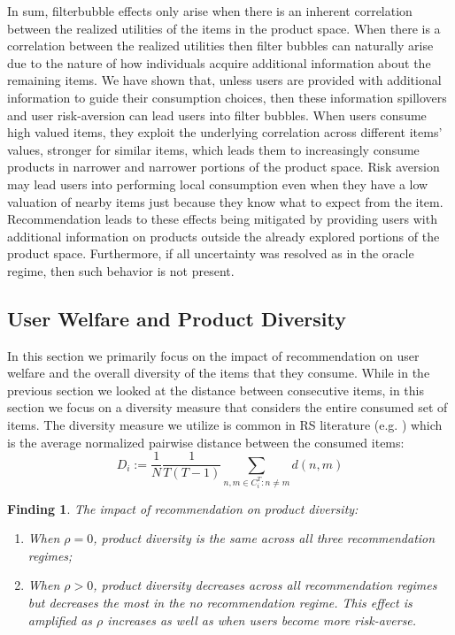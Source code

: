 \documentclass[manuscript]{acmart}
\newtheorem{finding}{Finding}
\begin{document}
In sum, filter\dgedit{-}bubble effects only arise when there is an inherent correlation between the realized utilities of the items in the product space. When there is a correlation between the realized utilities then filter bubbles can naturally arise due to the nature of how individuals acquire additional information about the remaining items. We have shown that, unless users are provided with additional information to guide their consumption choices, then these information spillovers and user risk-aversion can lead users into filter bubbles. When users consume high valued items, they exploit the underlying correlation across different items' values, stronger for similar items, which leads them to increasingly consume products in narrower and narrower portions of the product space. Risk aversion may lead users into performing local consumption even when they have a low valuation of nearby items just because they know what to expect from the item. Recommendation leads to these effects being mitigated by providing users with additional information on products outside the already explored portions of the product space. Furthermore, if all uncertainty was resolved as in the oracle regime, then such behavior is not present.


\subsection{User Welfare and Product Diversity}

In this section we primarily focus on the impact of recommendation on user welfare and the overall diversity of the items that they consume. While in the previous section we looked at the distance between consecutive items, in this section we focus on a diversity measure that considers the entire consumed set of items. The diversity measure we utilize is common in RS literature (e.g. \cite{ziegler2005improving}) which is the average normalized pairwise distance between the consumed items:
$$D_i:=\frac{1}{N}\frac{1}{T(T-1)}\sum_{n,m \in C_i^T: n \ne m} d(n,m)$$
\begin{finding}\label{finding_diversity}
The impact of recommendation on product diversity:
\begin{enumerate}
\item When $\rho = 0$, product diversity is the same across all three recommendation regimes;
\item When $\rho > 0$, product diversity decreases across all recommendation regimes but decreases the most in the no recommendation regime. This effect is amplified as $\rho$ increases as well as when users become more risk-averse.
\end{enumerate}
\end{finding}
\par 
\end{document}

